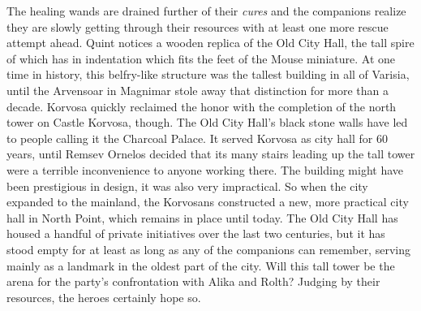 The healing wands are drained further of their {\itshape cures} and the companions realize they are slowly getting through their resources with at least one more rescue attempt ahead. Quint notices a wooden replica of the Old City Hall, the tall spire of which has in indentation which fits the feet of the Mouse miniature. At one time in history, this belfry-like structure was the tallest building in all of Varisia, until the Arvensoar in Magnimar stole away that distinction for more than a decade. Korvosa quickly reclaimed the honor with the completion of the north tower on Castle Korvosa, though. The Old City Hall's black stone walls have led to people calling it the Charcoal Palace. It served Korvosa as city hall for 60 years, until Remsev Ornelos decided that its many stairs leading up the tall tower were a terrible inconvenience to anyone working there. The building might have been prestigious in design, it was also very impractical. So when the city expanded to the mainland, the Korvosans constructed a new, more practical city hall in North Point, which remains in place until today. The Old City Hall has housed a handful of private initiatives over the last two centuries, but it has stood empty for at least as long as any of the companions can remember, serving mainly as a landmark in the oldest part of the city. Will this tall tower be the arena for the party's confrontation with Alika and Rolth? Judging by their resources, the heroes certainly hope so. 